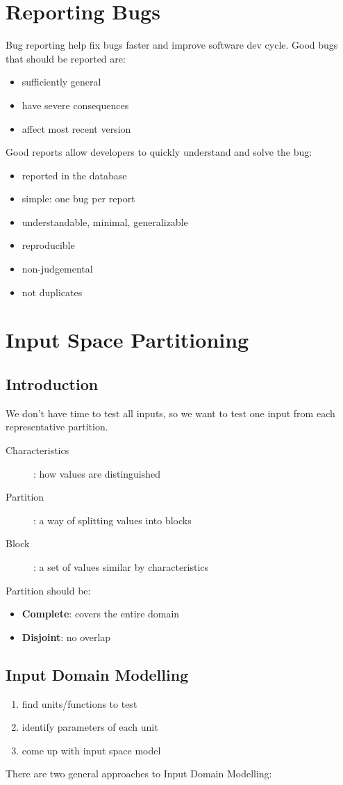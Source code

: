 \documentclass[]{article}
\theoremstyle{definition}
\begin{document}
		\section{Reporting Bugs}
		Bug reporting help fix bugs faster and improve software dev cycle. Good bugs that should be reported are:
		\begin{itemize}
			\item sufficiently general
			\item have severe consequences
			\item affect most recent version
		\end{itemize}
		Good reports allow developers to quickly understand and solve the bug:
		\begin{itemize}
			\item reported in the database
			\item simple: one bug per report
			\item understandable, minimal, generalizable
			\item reproducible
			\item non-judgemental
			\item not duplicates
		\end{itemize}

		\section{Input Space Partitioning}
		\subsection{Introduction}
		We don't have time to test all inputs, so we want to test one input from each representative partition. 
		\begin{description}
			\item[Characteristics]: how values are distinguished
			\item[Partition]: a way of splitting values into blocks
			\item[Block]: a set of values similar by characteristics
		\end{description}
		
		Partition should be:
		\begin{itemize}
			\item \textbf{Complete}: covers the entire domain
			\item \textbf{Disjoint}: no overlap
		\end{itemize}
		
		\subsection{Input Domain Modelling}
		\begin{enumerate}
			\item find units/functions to test
			\item identify parameters of each unit
			\item come up with input space model
		\end{enumerate}
		There are two general approaches to Input Domain Modelling:
\end{document}
